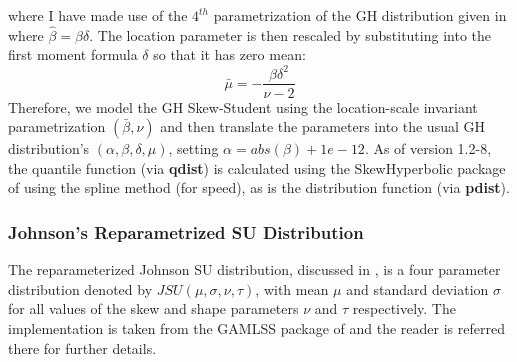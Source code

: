 where I have made use of the $4^{th}$ parametrization of the GH distribution given in
\cite{Prause1999} where $\hat \beta = \beta \delta$. The location parameter is then rescaled
by substituting into the first moment formula $\delta$ so that it has zero mean:
\begin{equation}
\bar \mu  =  - \frac{{\beta {\delta ^2}}}{{\nu  - 2}}
\end{equation}
Therefore, we model the GH Skew-Student using the location-scale invariant parametrization $(\bar \beta, \nu)$
and then translate the parameters into the usual GH distribution's $(\alpha, \beta, \delta, \mu)$, setting
$\alpha = abs(\beta)+1e-12$.
As of version 1.2-8, the quantile function (via \textbf{qdist}) is calculated using
the SkewHyperbolic package of \cite{Scott} using the spline method (for speed), as
is the distribution function (via \textbf{pdist}).
\subsubsection{Johnson's Reparametrized SU Distribution}\label{jsu}
The reparameterized Johnson SU distribution, discussed in \cite{Rigby2005}, is a
four parameter distribution denoted by $JSU\left(\mu,\sigma,\nu,\tau\right)$,
with mean $\mu$ and standard deviation $\sigma$ for all values of the skew and
shape parameters $\nu$ and $\tau$ respectively. The implementation is taken
from the GAMLSS package of \cite{Stasinopoulos2009} and the reader is referred
there for further details.


